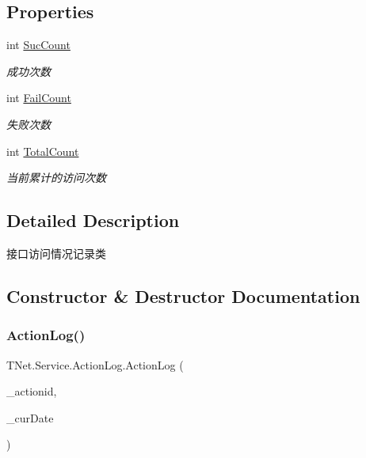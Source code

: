 \subsection*{Properties}
\begin{DoxyCompactItemize}
\item 
int \mbox{\hyperlink{class_t_net_1_1_service_1_1_action_log_ac94f67c2ac6d9c588df9eb3d149a631f}{Suc\+Count}}
\begin{DoxyCompactList}\small\item\em 成功次数 \end{DoxyCompactList}\item 
int \mbox{\hyperlink{class_t_net_1_1_service_1_1_action_log_a75e9dd7f1cb49dc0ac76a8ca7bfc2767}{Fail\+Count}}
\begin{DoxyCompactList}\small\item\em 失败次数 \end{DoxyCompactList}\item 
int \mbox{\hyperlink{class_t_net_1_1_service_1_1_action_log_ab8db71b0579fa9a1ac072e4cd56d2fb5}{Total\+Count}}
\begin{DoxyCompactList}\small\item\em 当前累计的访问次数 \end{DoxyCompactList}\end{DoxyCompactItemize}


\subsection{Detailed Description}
接口访问情况记录类 



\subsection{Constructor \& Destructor Documentation}
\mbox{\label{class_t_net_1_1_service_1_1_action_log_a9123f4bf9b56a7b221548c8fb278218e}} 
\subsubsection{\texorpdfstring{Action\+Log()}{ActionLog()}}
{\footnotesize\ttfamily T\+Net.\+Service.\+Action\+Log.\+Action\+Log (\begin{DoxyParamCaption}\item[{int}]{\+\_\+actionid,  }\item[{Date\+Time}]{\+\_\+cur\+Date }\end{DoxyParamCaption})}




